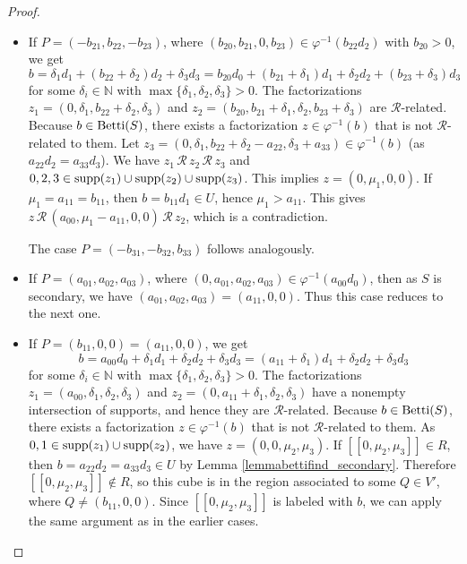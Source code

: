 \documentclass[12pt]{article}
\theoremstyle{remark}
\begin{document}
\begin{proof}
\begin{itemize}
\item
    If $P =(-b_{21},b_{22},-b_{23})$, where $(b_{20},b_{21},0,b_{23}) \in \varphi^{-1} (b_{22}d_2)$ with $b_{20}>0$, we get
    \begin{equation}
        b = \delta_1d_1 +   (b_{22}+\delta_2)d_2 + \delta_3d_3  =  b_{20}d_0 + (b_{21}+\delta_1)d_1+ \delta_2d_2 + (b_{23}+\delta_3)d_3
    \end{equation}
    for some $\delta_i \in \mathbb{N}$ with $\max \{\delta_1,\delta_2,\delta_3\} > 0$. The factorizations $z_1 =(0,\delta_1,b_{22}+\delta_2,\delta_3)$ and $z_2 =(b_{20},b_{21}+\delta_1,\delta_2,b_{23}+\delta_3)$ are $\mathcal{R}$-related. 
    Because $b \in \textup{Betti}(S)$, there exists a factorization $z \in \varphi^{-1}(b)$ that is not $\mathcal{R}$-related to them. Let $z_3 = (0,\delta_1,b_{22}+\delta_2 - a_{22},\delta_3+a_{33}) \in \varphi^{-1}(b)$ (as $a_{22}d_2 = a_{33}d_3$). We have $z_1 \, \mathcal{R} \, z_2 \, \mathcal{R} \,   z_3 $ and $0,2,3 \in \textup{supp}(z_1) \cup \textup{supp}(z_2) \cup \textup{supp}(z_3)$. This implies $z = (0,\mu_1,0,0)$. If $\mu_1 = a_{11} = b_{11}$, then $b = b_{11}d_1 \in U$, hence $\mu_1 > a_{11}$. This gives $z \, \mathcal{R} \, (a_{00},\mu_1-a_{11},0,0) \, \mathcal{R} \, z_2$, which is a contradiction.  
     

    The case $P = (-b_{31},-b_{32},b_{33})$ follows analogously.
\item
    If $P = (a_{01},a_{02},a_{03})$, where $(0,a_{01},a_{02},a_{03}) \in \varphi^{-1}(a_{00}d_0)$, then as $S$ is secondary, we have $(a_{01},a_{02},a_{03}) = (a_{11},0,0)$. Thus this case reduces to the next one.
\item    
    If $P =(b_{11},0,0)=(a_{11},0,0)$, we get
     \begin{equation}
        b =a_{00}d_0 + \delta_1d_1 + \delta_2d_2 + \delta_3d_3  =  (a_{11}+\delta_1)d_1 + \delta_2d_2 + \delta_3d_3
    \end{equation}
    for some $\delta_i \in \mathbb{N}$ with $\max \{\delta_1,\delta_2,\delta_3\} > 0$. The factorizations $z_1 =(a_{00},\delta_1,\delta_2,\delta_3)$ and $z_2 =(0,a_{11}+\delta_1,\delta_2,\delta_3)$ have a nonempty intersection of supports, and hence they are $\mathcal{R}$-related. Because $b \in \textup{Betti}(S)$, there exists a factorization $z \in \varphi^{-1}(b)$ that is not $\mathcal{R}$-related to them. As $0,1 \in \textup{supp}(z_1) \cup \textup{supp}(z_2)$, we have $z = (0,0,\mu_2,\mu_3)$. If $[[0,\mu_2,\mu_3]] \in R$, then $b =a_{22}d_2=a_{33}d_3 \in U$ by Lemma \ref{lemmabettifind_secondary}. Therefore $[[0,\mu_2,\mu_3]] \notin R$, so this cube is in the region associated to some $Q \in V'$, where $Q \neq (b_{11},0,0)$. Since $[[0,\mu_2,\mu_3]]$ is labeled with $b$, we can apply the same argument as in the earlier cases. \qedhere
\end{itemize}
\end{proof}
\end{document}
